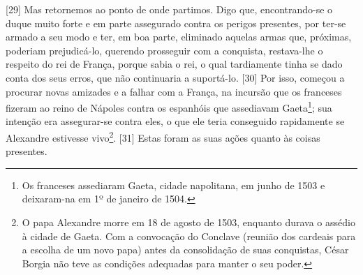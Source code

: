 {[}29{]} Mas retornemos ao ponto de onde partimos. Digo que,
encontrando-se o duque muito forte e em parte assegurado contra os
perigos presentes, por ter-se armado a seu modo e ter, em boa parte,
eliminado aquelas armas que, próximas, poderiam prejudicá-lo, querendo
prosseguir com a conquista, restava-lhe o respeito do rei de França,
porque sabia o rei, o qual tardiamente tinha se dado conta dos seus
erros, que não continuaria a suportá-lo. {[}30{]} Por isso, começou a
procurar novas amizades e a falhar com a França, na incursão que os
franceses fizeram ao reino de Nápoles contra os espanhóis que assediavam
Gaeta\footnote{Os franceses assediaram Gaeta, cidade napolitana, em
  junho de 1503 e deixaram-na em 1º de janeiro de 1504.}; sua intenção
era assegurar-se contra eles, o que ele teria conseguido rapidamente se
Alexandre estivesse vivo\footnote{O papa Alexandre  morre em 18 de
  agosto de 1503, enquanto durava o assédio à cidade de Gaeta. Com a
  convocação do Conclave (reunião dos cardeais para a escolha de um novo
  papa) antes da consolidação de suas conquistas, César Borgia não teve
  as condições adequadas para manter o seu poder.}. {[}31{]} Estas foram
as suas ações quanto às coisas presentes.

